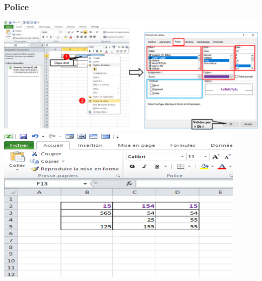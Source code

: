 \subsubsection{Police}
\begin{center}  
	\includegraphics[scale=0.2,width= \linewidth]{img/police_text}
	\includegraphics[scale=0.2,width= \linewidth]{img/police_exemple}
\end{center}
